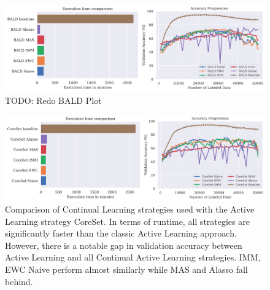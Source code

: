 \begin{figure} [ht]
    \centering
    \includegraphics[width=\linewidth]{images/results_CAL/Bald_CAL_1000b.png}
    \caption[Continual Active Learning BALD 1000 batch size]{TODO: Redo BALD Plot}
    \label{fig:Evaluation:Results:CAL:BALD1000}
\end{figure}

\begin{figure} [ht]
    \centering
    \includegraphics[width=\linewidth]{images/results_CAL/CoreSet_CAL_1000b.png}
    \caption[Continual Active Learning CoreSet 1000 batch size]{Comparison of Continual Learning strategies used with the Active Learning strategy CoreSet. In terms of runtime, all
    strategies are significantly faster than the classic Active Learning approach. However, there is a notable gap in validation accuracy between Active Learning and all Continual
    Active Learning strategies. IMM, EWC Naive perform almost similarly while MAS and Alasso fall behind.}
    \label{fig:Evaluation:Results:CAL:CoreSet1000}
\end{figure}

